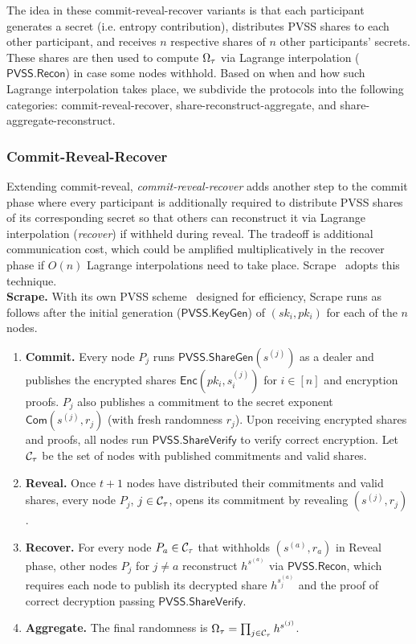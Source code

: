 The idea in these commit-reveal-recover variants is that each participant generates a secret (i.e. entropy contribution), distributes PVSS shares to each other participant, and receives $n$ respective shares of $n$ other participants' secrets. These shares are then used to compute $\Omega_\tau$ via Lagrange interpolation ($\mathsf{PVSS.Recon}$) in case some nodes withhold. Based on when and how such Lagrange interpolation takes place, we subdivide the protocols into the following categories: commit-reveal-recover, share-reconstruct-aggregate, and share-aggregate-reconstruct.

\subsubsection{Commit-Reveal-Recover}
Extending commit-reveal, \textit{commit-reveal-recover} adds another step to the commit phase where every participant is additionally required to distribute PVSS shares of its corresponding secret so that others can reconstruct it via Lagrange interpolation (\textit{recover}) if withheld during reveal. The tradeoff is additional communication cost, which could be amplified multiplicatively in the recover phase if $O(n)$ Lagrange interpolations need to take place. Scrape~\cite{cascudo2017scrape} adopts this technique.\\

\noindent\textbf{Scrape.} With its own PVSS scheme~\cite{cascudo2017scrape} designed for efficiency, Scrape runs as follows after the initial generation ($\mathsf{PVSS.KeyGen}$) of $(sk_i, pk_i)$ for each of the $n$ nodes.
\begin{enumerate}
\item \textbf{Commit.} Every node $P_j$ runs $\mathsf{PVSS.ShareGen}(s^{(j)})$ as a dealer and publishes the encrypted shares $\mathsf{Enc}(pk_i, s^{(j)}_i)$ for $i \in [n]$ and encryption proofs. $P_j$ also publishes a commitment to the secret exponent $\mathsf{Com}(s^{(j)}, r_j)$ (with fresh randomness $r_j$). Upon receiving encrypted shares and proofs, all nodes run $\mathsf{PVSS.ShareVerify}$ to verify correct encryption. Let $\mathcal{C}_\tau$ be the set of nodes with published commitments and valid shares.
\item \textbf{Reveal.} Once $t + 1$ nodes have distributed their commitments and valid shares, every node $P_j$, $j \in \mathcal{C}_\tau$, opens its commitment by revealing $(s^{(j)}, r_j)$.
\item \textbf{Recover.} For every node $P_a \in \mathcal{C}_\tau$ that withholds $(s^{(a)}, r_a)$ in Reveal phase, other nodes $P_j$ for $j \neq a$ reconstruct $h^{s^{(a)}}$ via $\mathsf{PVSS.Recon}$, which requires each node to publish its decrypted share $h^{s_j^{(a)}}$ and the proof of correct decryption passing $\mathsf{PVSS.ShareVerify}$.
\item \textbf{Aggregate.} The final randomness is $\Omega_\tau = \prod_{j \in \mathcal{C}_\tau} h^{s^{(j)}}$.
\end{enumerate}

